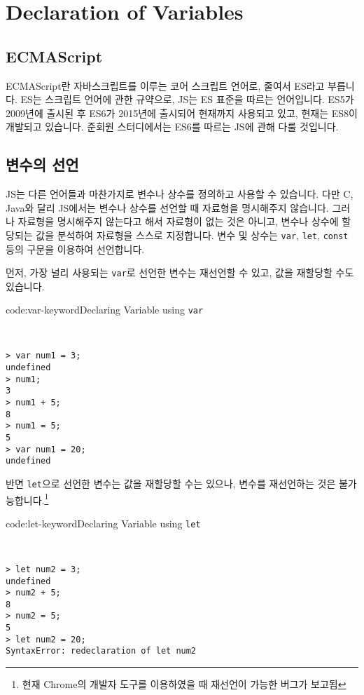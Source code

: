 \section{Declaration of Variables} \label{sect:declaration-of-variables}

\subsection*{ECMAScript}

ECMAScript란 자바스크립트를 이루는 코어 스크립트 언어로, 줄여서 ES라고 부릅니다. ES는 스크립트 언어에 관한 규약으로, JS는 ES 표준을 따르는 언어입니다. ES5가 2009년에 출시된 후 ES6가 2015년에 출시되어 현재까지 사용되고 있고, 현재는 ES8이 개발되고 있습니다. 준회원 스터디에서는 ES6를 따르는 JS에 관해 다룰 것입니다.

\subsection*{변수의 선언}

JS는 다른 언어들과 마찬가지로 변수나 상수를 정의하고 사용할 수 있습니다. 다만 C, Java와 달리 JS에서는 변수나 상수를 선언할 때 자료형을 명시해주지 않습니다. 그러나 자료형을 명시해주지 않는다고 해서 자료형이 없는 것은 아니고, 변수나 상수에 할당되는 값을 분석하여 자료형을 스스로 지정합니다. 변수 및 상수는 \texttt{var}, \texttt{let}, \texttt{const} 등의 구문을 이용하여 선언합니다. 

먼저, 가장 널리 사용되는 \texttt{var}로 선언한 변수는 재선언할 수 있고, 값을 재할당할 수도 있습니다.

\begin{codeenv}{code:var-keyword}{Declaring Variable using \texttt{var}}\begin{verbatim}


> var num1 = 3;
undefined
> num1;
3
> num1 + 5;
8
> num1 = 5;
5
> var num1 = 20;
undefined
\end{verbatim}
\end{codeenv}

반면 \texttt{let}으로 선언한 변수는 값을 재할당할 수는 있으나, 변수를 재선언하는 것은 불가능합니다.\footnote{현재 Chrome의 개발자 도구를 이용하였을 때 재선언이 가능한 버그가 보고됨}

\begin{codeenv}{code:let-keyword}{Declaring Variable using \texttt{let}}\begin{verbatim}


> let num2 = 3;
undefined
> num2 + 5;
8
> num2 = 5;
5
> let num2 = 20;
SyntaxError: redeclaration of let num2
\end{verbatim}
\end{codeenv}

